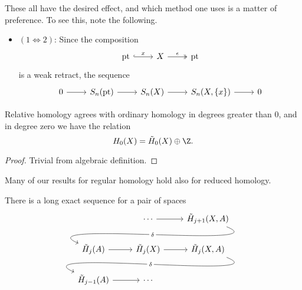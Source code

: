 \documentclass[main.tex]{subfiles}
\begin{document}
These all have the desired effect, and which method one uses is a matter of preference. To see this, note the following.
\begin{itemize}
  \item $(1 \Leftrightarrow 2)$: Since the composition
    \begin{equation*}
      \begin{tikzcd}
        \mathrm{pt}
        \arrow[r, hook, "x"]
        & X
        \arrow[r, two heads, "\epsilon"]
        & \mathrm{pt}
      \end{tikzcd}
    \end{equation*}
    is a weak retract, the sequence
    \begin{equation*}
      \begin{tikzcd}
        0
        \arrow[r]
        & S_{n}(\mathrm{pt})
        \arrow[r]
        & S_{n}(X)
        \arrow[r]
        & S_{n}(X, \{x\})
        \arrow[r]
        & 0
      \end{tikzcd}
    \end{equation*}
\end{itemize}

\begin{proposition}
  Relative homology agrees with ordinary homology in degrees greater than 0, and in degree zero we have the relation
  \begin{equation*}
    H_{0}(X) = \tilde{H}_{0}(X) \oplus \Z.
  \end{equation*}
\end{proposition}
\begin{proof}
  Trivial from algebraic definition.
\end{proof}

Many of our results for regular homology hold also for reduced homology.

\begin{proposition}
  There is a long exact sequence for a pair of spaces
  \begin{equation*}
    \begin{tikzcd}
      & \cdots
      \arrow[r]
      & \tilde{H}_{j+1}(X, A)
      \\
      \tilde{H}_{j}(A)
      \arrow[from=urr, out=-22, in=157, looseness=1, overlay, "\delta" description]
      \arrow[r,]
      & \tilde{H}_{j}(X)
      \arrow[r,]
      & \tilde{H}_{j}(X, A)
      \\
      \tilde{H}_{j-1}(A)
      \arrow[r]
      \arrow[from=urr, out=-22, in=157, looseness=1, overlay, "\delta" description]
      & \cdots
    \end{tikzcd}
  \end{equation*}
\end{proposition}
\end{document}
